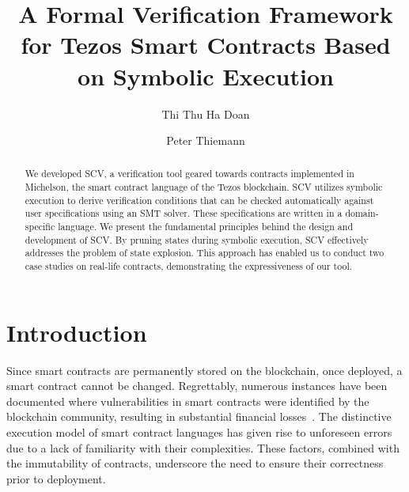 \documentclass[runningheads]{llncs}
\begin{document}
%
\title{A Formal Verification Framework for Tezos Smart Contracts Based on Symbolic Execution}
%
%
\author{Thi Thu Ha Doan\and Peter Thiemann}

%
%
%
\maketitle              %
%
\begin{abstract}
We developed SCV, a verification tool geared towards contracts implemented in Michelson, the smart contract language of the Tezos blockchain. SCV utilizes symbolic execution to derive verification conditions that can be checked automatically against user specifications using an SMT solver. These specifications are written in a domain-specific language. We present the fundamental principles behind the design and development of SCV. By pruning states during symbolic execution, SCV effectively addresses the problem of state explosion. This approach has enabled us to conduct two case studies on real-life contracts, demonstrating the expressiveness of our tool.
\end{abstract}
\section{Introduction}
\label{sec:introduction}
Since smart contracts are permanently stored on the blockchain, once deployed, a smart contract cannot be changed. Regrettably, numerous instances have been documented where vulnerabilities in smart contracts were identified by the blockchain community, resulting in substantial financial losses~\cite{dao,wallethack}. The distinctive execution model of smart contract languages has given rise to unforeseen errors due to a lack of familiarity with their complexities. These factors, combined with the immutability of contracts, underscore the need to ensure their correctness prior to deployment.
\end{document}
